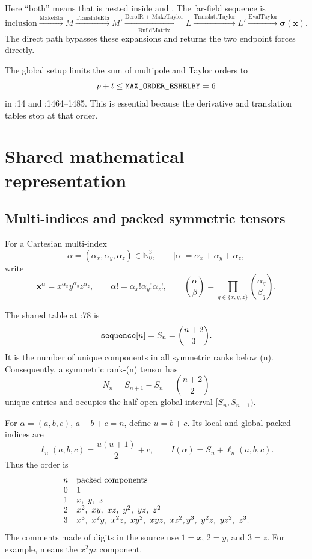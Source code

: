 \documentclass[11pt]{article}
\newcommand{\vect}[1]{\bm{#1}}
\newcommand{\abs}[1]{\left\lvert #1\right\rvert}
\newcommand{\code}[1]{\texttt{\detokenize{#1}}}
\begin{document}
Here ``both'' means that  is nested inside
\code{ESHELBY} and \code{ESHELBYFORCE}.  The far-field sequence is
\[
\boxed{
\text{inclusion}
\xrightarrow{\text{MakeEta}} M
\xrightarrow{\text{TranslateEta}} M'
\xrightarrow[\text{BuildMatrix}]{\text{DerofR + MakeTaylor}} L
\xrightarrow{\text{TranslateTaylor}} L'
\xrightarrow{\text{EvalTaylor}} \vect{\sigma}(\vect{x}) .
}
\]
The direct path  bypasses these expansions and
returns the two endpoint forces directly.

The global setup limits the sum of multipole and Taylor orders to
\[
p+t\leq \code{MAX_ORDER_ESHELBY}=6
\]
in :14 and :1464--1485.  This is
essential because the derivative and translation tables stop at that order.

\section{Shared mathematical representation}

\subsection{Multi-indices and packed symmetric tensors}

For a Cartesian multi-index
\[
\alpha=(\alpha_x,\alpha_y,\alpha_z)\in\mathbb{N}_0^3,
\qquad
\abs{\alpha}=\alpha_x+\alpha_y+\alpha_z,
\]
write
\[
\vect{x}^{\alpha}=x^{\alpha_x}y^{\alpha_y}z^{\alpha_z},
\qquad
\alpha!=\alpha_x!\alpha_y!\alpha_z!,
\qquad
\binom{\alpha}{\beta}
=\prod_{q\in\{x,y,z\}}\binom{\alpha_q}{\beta_q}.
\]

The shared table at :78 is
\[
\code{sequence}[n]=S_n=\binom{n+2}{3}.
\]
It is the number of unique components in all symmetric ranks below (n).
Consequently, a symmetric rank-(n) tensor has
\[
N_n=S_{n+1}-S_n=\binom{n+2}{2}
\]
unique entries and occupies the half-open global interval
\([S_n,S_{n+1})\).

For \(\alpha=(a,b,c)\), \(a+b+c=n\), define \(u=b+c\).  Its local and global
packed indices are
\begin{equation}
\ell_n(a,b,c)=\frac{u(u+1)}{2}+c,
\qquad
I(\alpha)=S_n+\ell_n(a,b,c).
\label{eq:packed-index}
\end{equation}
Thus the order is
\[
\begin{array}{@{}cl@{}}
n&\text{packed components}\ \\
0&1\\
1&x,\ y,\ z\\
2&x^2,\ xy,\ xz,\ y^2,\ yz,\ z^2\\
3&x^3,\ x^2y,\ x^2z,\ xy^2,\ xyz,\ xz^2,
   y^3,\ y^2z,\ yz^2,\ z^3.
\end{array}
\]
The comments made of digits in the source use \(1=x\), \(2=y\), and \(3=z\).
For example, \code{1 1 2 3} means the \(x^2yz\) component.
\end{document}
